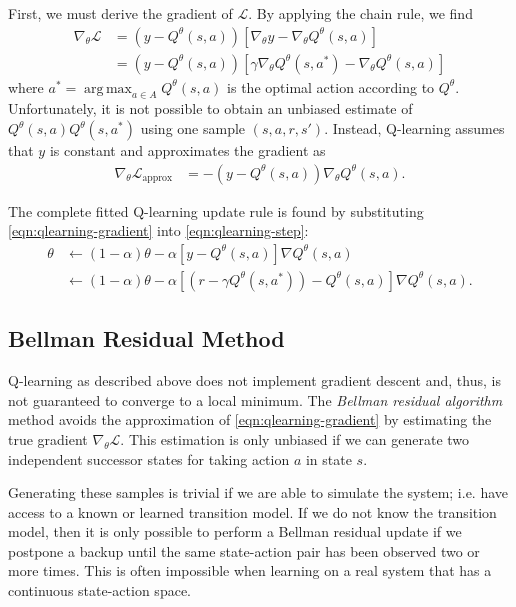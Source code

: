 \documentclass[11pt]{article}
\numberwithin{equation}{section}
\numberwithin{figure}{section}
\DeclareMathOperator*{\argmax}{arg\,max}
\begin{document}
First, we must derive the gradient of $\mathcal{L}$. By applying the chain
rule, we find
\begin{align*}
    \nabla_\theta \mathcal{L} &= \left(y - Q^\theta(s, a)\right) \left[
                                      \nabla_\theta y
                                    - \nabla_\theta Q^\theta(s, a) \right] \\
                              &= \left(y - Q^\theta(s, a)\right) \left[
                                      \gamma \nabla_\theta Q^\theta(s, a^*)
                                    - \nabla_\theta Q^\theta(s, a) \right]
\end{align*}
where $a^* = \argmax_{a \in A} Q^\theta(s, a)$ is the optimal action according
to $Q^\theta$. Unfortunately, it is not possible to obtain an unbiased estimate
of $Q^\theta(s, a) Q^\theta(s, a^*)$ using one sample $(s, a, r, s')$. Instead,
Q-learning assumes that $y$ is constant and approximates the gradient as
\begin{align}
    \nabla_\theta \mathcal{L}_\text{approx} &= -\left(y - Q^\theta(s, a)\right)
                                       \nabla_\theta Q^\theta(s, a).
    \label{eqn:qlearning-gradient}
\end{align}

The complete fitted Q-learning update rule is found by substituting
\cref{eqn:qlearning-gradient} into \cref{eqn:qlearning-step}:
\begin{align*}
    \theta &\gets (1 - \alpha) \theta - \alpha \left[
                y - Q^\theta(s, a)\right] \nabla Q^\theta (s, a) \\
           &\gets (1 - \alpha) \theta - \alpha \left[
                \left( r - \gamma Q^\theta(s, a^*) \right)
                - Q^\theta(s, a)\right] \nabla Q^\theta (s, a).
\end{align*}

\subsection{Bellman Residual Method}
Q-learning as described above does not implement gradient descent and, thus, is
not guaranteed to converge to a local minimum. The \emph{Bellman residual
algorithm} method avoids the approximation of \cref{eqn:qlearning-gradient} by
estimating the true gradient $\nabla_\theta \mathcal{L}$. This estimation is
only unbiased if we can generate two independent successor states for taking
action $a$ in state $s$.

Generating these samples is trivial if we are able to simulate the system; i.e.
have access to a known or learned transition model. If we do not know the
transition model, then it is only possible to perform a Bellman residual update
if we postpone a backup until the same state-action pair has been observed two
or more times. This is often impossible when learning on a real system that has
a continuous state-action space.
\end{document}

